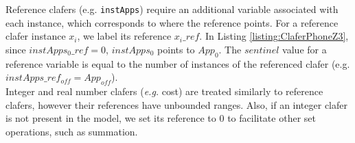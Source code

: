 \documentclass{easychair}
\newcommand{\eg}{\emph{e.g.}\xspace}
\begin{document}
\indent Reference clafers (e.g. \texttt{instApps}) require an additional variable associated with each instance, which corresponds to where the reference points. For a reference clafer instance $x_i$, we label its reference $x_i\_ref$. In Listing \ref{listing:ClaferPhoneZ3}, since $instApps_0\_ref = 0$, $instApps_0$ points to $App_0$. The $sentinel$ value for a reference variable is equal to the number of instances of the referenced clafer (e.g. $instApps\_ref_{off} = App_{off}$).  \\
\indent Integer and real number clafers (\eg cost) are treated similarly to reference clafers, however their references have unbounded ranges. Also, if an integer clafer is not present in the model, we set its reference to 0 to facilitate other set operations, such as summation. \\
\end{document}
